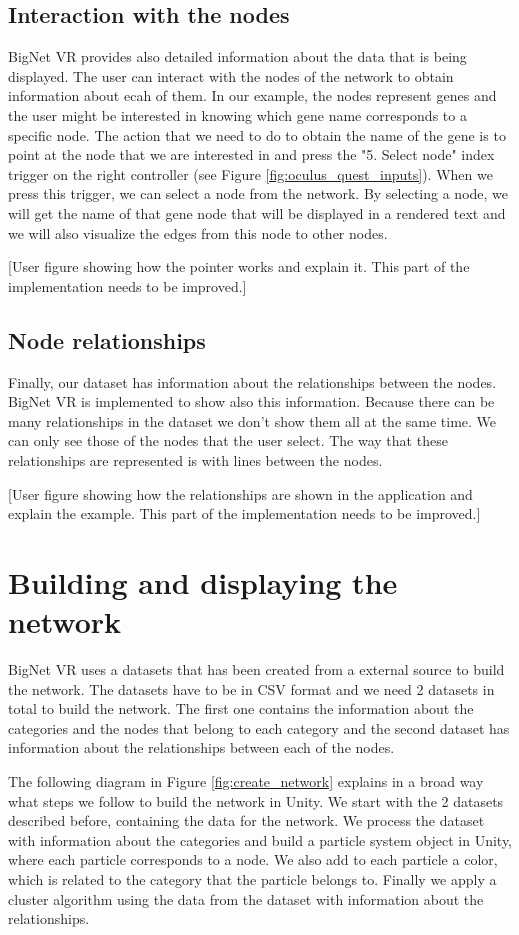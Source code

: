 \subsection{Interaction with the nodes}
BigNet VR provides also detailed information about the data that is being displayed. The user can interact with the nodes of the network to obtain information about ecah of them. In our example, the nodes represent genes and the user might be interested in knowing which gene name corresponds to a specific node. The action that we need to do to obtain the name of the gene is to point at the node that we are interested in and press the "5. Select node" index trigger on the right controller (see Figure \ref{fig:oculus_quest_inputs}). When we press this trigger, we can select a node from the network. By selecting a node, we will get the name of that gene node that will be displayed in a rendered text and we will also visualize the edges from this node to other nodes.

[User figure showing how the pointer works and explain it. This part of the implementation needs to be improved.]

\subsection{Node relationships}
Finally, our dataset has information about the relationships between the nodes. BigNet VR is implemented to show also this information. Because there can be many relationships in the dataset we don't show them all at the same time. We can only see those of the nodes that the user select. The way that these relationships are represented is with lines between the nodes.

[User figure showing how the relationships are shown in the application and explain the example. This part of the implementation needs to be improved.]


\section{Building and displaying the network}
BigNet VR uses a datasets that has been created from a external source to build the network. The datasets have to be in CSV format and we need 2 datasets in total to build the network. The first one contains the information about the categories and the nodes that belong to each category and the second dataset has information about the relationships between each of the nodes.

The following diagram in Figure \ref{fig:create_network} explains in a broad way what steps we follow to build the network in Unity. We start with the 2 datasets described before, containing the data for the network. We process the dataset with information about the categories and build a particle system object in Unity, where each particle corresponds to a node. We also add to each particle a color, which is related to the category that the particle belongs to. Finally we apply a cluster algorithm using the data from the dataset with information about the relationships.

